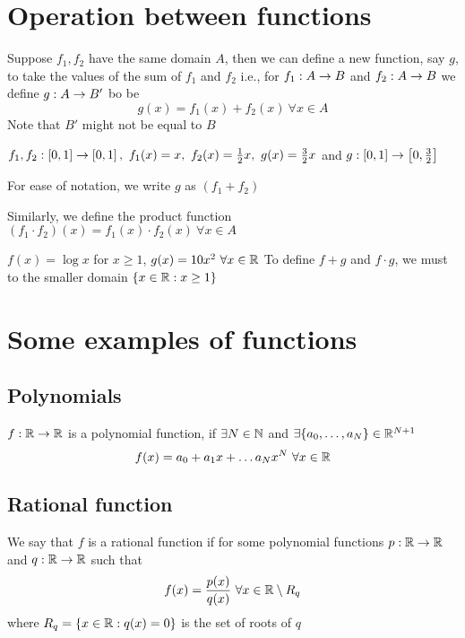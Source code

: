 \section{Operation between functions}
Suppose $f_1, f_2$ have the same domain $A$, then we can define a new function, say $g$, to take the values of the sum of $f_1$ and $f_2$
i.e., for $f_1: A \rightarrow B$ and $f_2: A \rightarrow B$ we define $g: A \rightarrow B'$ bo be
$$g(x) = f_1(x) + f_2(x)\ \forall x \in A$$
Note that $B'$ might not be equal to $B$

\begin{example*}
    $f_1, f_2 : \left[0,1\right] \rightarrow \left[0,1\right],\ f_1(x) = x,\ f_2(x) = \frac{1}{2}x,\ g(x) = \frac{3}{2}x$ and $g: \left[0,1\right] \rightarrow \left[0,\frac{3}{2}\right]$
\end{example*}
For ease of notation, we write $g$ as $(f_1 + f_2)$

Similarly, we define the product function $(f_1 \cdot f_2)(x) = f_1(x)\cdot f_2(x) \ \forall x \in A$
\begin{example*}
    $f(x) = \log x$ for $x \geq 1$, $g(x) = 10x^2\ \forall x \in \mathbb R$ 
    To define $f+g$ and $f\cdot g$, we must to the smaller domain $\{x\in\mathbb R : x \geq 1\}$
\end{example*}

\section{Some examples of functions}

\subsection{Polynomials}
\begin{definition}
    $f: \mathbb R \rightarrow \mathbb R$ is a polynomial function, if $\exists N \in \mathbb N$ and $\exists\{a_0, \dotsc, a_N\} \in \mathbb R^{N+1}$ 
    $$f(x) = a_0 + a_1x+ \dotsc a_Nx^N\ \forall x \in \mathbb R$$
\end{definition}
\subsection{Rational function}
\begin{definition}
    We say that $f$ is a rational function if for some polynomial functions $p: \mathbb R \rightarrow \mathbb R$ and $q: \mathbb R \rightarrow \mathbb R$ such that
    $$f(x) = \frac{p(x)}{q(x)}\ \forall x \in \mathbb R\setminus R_q$$
    where $R_q = \{x\in\mathbb R:q(x) = 0\}$ is the set of roots of $q$
\end{definition}


